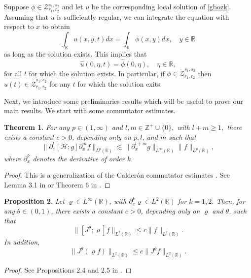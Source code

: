 \documentclass[reqno]{amsart}
\newcommand{\R}{\mathbb R}
\newcommand{\Z}{\mathbb Z}
\numberwithin{equation}{section}
\newtheorem{theorem}{Theorem}[section]
\newtheorem{proposition}[theorem]{Proposition}
\begin{document}
Suppose  $\phi\in \mathcal{Z}_{r_1,r_2}^{s_1,s_2}$ and let $u$ be the corresponding local solution of
\eqref{gbozk}. Assuming  that $u$ is sufficiently regular, we can integrate
the equation with respect to $x$ to obtain
\begin{equation}\label{consquan}
\int_{\R}u(x,y,t)dx=\int_\R\phi(x,y)dx, \quad y\in\R
\end{equation}
as long as the solution exists. This implies that
\begin{equation}\label{fourieru}
\hat{u}(0,\eta,t)=\hat{\phi}(0,\eta), \quad \eta\in \R,
\end{equation}
for all $t$ for which the solution exists. In particular, if $\phi\in
\dot{\mathcal{Z}}_{r_1,r_2}^{s_1,s_2}$ then $u(t)\in
\dot{\mathcal{Z}}_{r_1,r_2}^{s_1,s_2}$ for any
$t$ for which the solution exits. 



Next, we introduce some preliminaries results which will be useful to
prove our main results. We start with  some commutator estimates. 

\begin{theorem}\label{Comu}
For any $p\in (1,\infty)$ and $l,m\in \Z^{+}\cup \{0\},$ with $l+m\geq 1,$ there exists a constant  $c>0$, depending only on $p,l$, and $m$ such that
\begin{equation*}
\|\partial_{x}^{l}[\mathcal{H};g]\partial_{x}^{m}f\|_{L^p(\R)}\lesssim \|\partial_{x}^{l+m}g\|_{L^\infty(\R)}\|f\|_{L^p(\R)},
\end{equation*}
where $\partial_{x}^k$ denotes the derivative of order $k$.
\end{theorem}
\begin{proof}
This is a generalization of the Calder\'on commutator estimates \cite{Cald}. See Lemma 3.1 in \cite{Dawson} or Theorem 6 in \cite{GermanPonce}.
\end{proof}

\begin{proposition}\label{Jota}
Let  $\varrho \in L^{\infty}(\R)$, with $\partial_x^k \varrho \in L^{2}(\R)$ for $k=1,2$. Then, for any $\theta\in (0,1)$, there exists a constant $c>0$, depending only on $\varrho$ and $\theta$, such that
\begin{equation}\label{Jota1}
\|[J^\theta;\varrho]f\|_{L^2(\R)}\leq c \|f\|_{L^2(\R)}.
\end{equation}
In addition,
\begin{equation}\label{Jotaf1}
\|J^\theta(\varrho f)\|_{L^2(\R)}\leq c \|J^\theta f\|_{L^2(\R)}.
\end{equation}
\end{proposition}
\begin{proof}
See Propositions 2.4 and 2.5 in \cite{FLP1}.
\end{proof}
\end{document}
